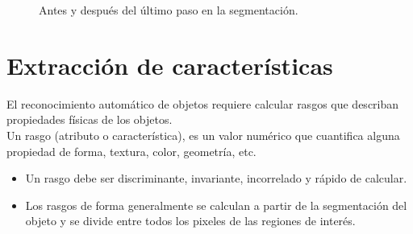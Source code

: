 \documentclass[a4paper, 11pt]{article}
\begin{document}
\begin{figure}[ht]%
    \centering
    \qquad
    \caption{Antes y después del último paso en la segmentación.}%
    \label{paso2}%
\end{figure}


\section{Extracción de características}

El reconocimiento automático de objetos requiere calcular rasgos que describan propiedades físicas de los objetos.\\

Un rasgo (atributo o característica), es un valor numérico que cuantifica alguna propiedad de forma, textura, color, geometría, etc.

\begin{itemize}
\item Un rasgo debe ser discriminante, invariante, incorrelado y rápido de calcular.
\item Los rasgos de forma generalmente se calculan a partir de la segmentación del objeto y se divide entre todos los pixeles de las regiones de interés.
\end{itemize}
\end{document}
